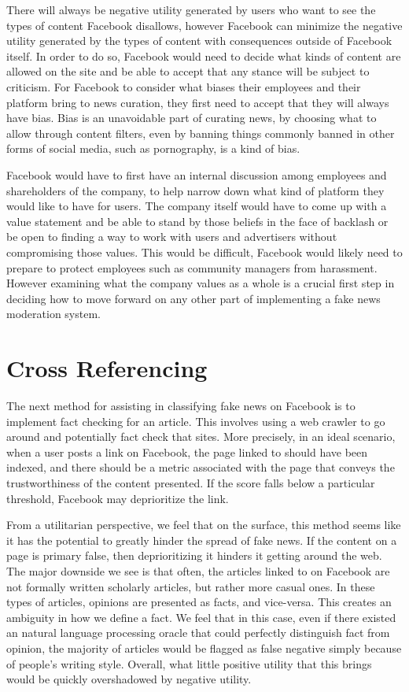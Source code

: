 \documentclass[12pt]{article}
\begin{document}
There will always be negative utility generated by users who want to see the types of content Facebook disallows, however Facebook can minimize the negative utility generated by the types of content with consequences outside of Facebook itself. In order to do so, Facebook would need to decide what kinds of content are allowed on the site and be able to accept that any stance will be subject to criticism. For Facebook to consider what biases their employees and their platform bring to news curation, they first need to accept that they will always have bias. Bias is an unavoidable part of curating news, by choosing what to allow through content filters, even by banning things commonly banned in other forms of social media, such as pornography, is a kind of bias.

Facebook would have to first have an internal discussion among employees and shareholders of the company, to help narrow down what kind of platform they would like to have for users. The company itself would have to come up with a value statement and be able to stand by those beliefs in the face of backlash or be open to finding a way to work with users and advertisers without compromising those values. This would be difficult, Facebook would likely need to prepare to protect employees such as community managers from harassment. However examining what the company values as a whole is a crucial first step in deciding how to move forward on any other part of implementing a fake news moderation system.

\section{Cross Referencing}
The next method for assisting in classifying fake news on Facebook is to implement fact checking for an article. This involves using a web crawler to go around and potentially fact check that sites. More precisely, in an ideal scenario, when a user posts a link on Facebook, the page linked to should have been indexed, and there should be a metric associated with the page that conveys the trustworthiness of the content presented. If the score falls below a particular threshold, Facebook may deprioritize the link.  

From a utilitarian perspective, we feel that on the surface, this method seems like it has the potential to greatly hinder the spread of fake news. If the content on a page is primary false, then deprioritizing it hinders it getting around the web. The major downside we see is that often, the articles linked to on Facebook are not formally written scholarly articles, but rather more casual ones. In these types of articles, opinions are presented as facts, and vice-versa. This creates an ambiguity in how we define a fact. We feel that in this case, even if there existed an natural language processing oracle that could perfectly distinguish fact from opinion, the majority of articles would be flagged as false negative simply because of people's writing style. Overall, what little positive utility that this brings would be quickly overshadowed by negative utility.
\end{document}

